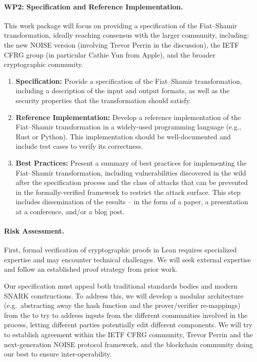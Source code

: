 \documentclass{article}
\begin{document}
\paragraph{WP2: Specification and Reference Implementation. }
This work package will focus on providing a specification of the Fiat--Shamir transformation, ideally reaching consensus with the larger community, including: the new NOISE version (involving Trevor Perrin in the discussion), the IETF CFRG group (in particular Cathie Yun from Apple), and the broader cryptographic community.
\begin{enumerate}[label=\textbf{Step \arabic*:}, leftmargin=*, itemsep=0.5em]

    \item \textbf{Specification:} Provide a specification of the Fiat--Shamir transformation, including a description of the input and output formats, as well as the security properties that the transformation should satisfy.
    \item \textbf{Reference Implementation:} Develop a reference implementation of the Fiat--Shamir transformation in a widely-used programming language (e.g., Rust or Python). This implementation should be well-documented and include test cases to verify its correctness.
    \item \textbf{Best Practices:} Present a summary of best practices for implementing the Fiat--Shamir transformation, including vulnerabilities discovered in the wild after the specification process and the class of attacks that can be prevented in the formally-verified framework to restrict the attack surface. This step includes dissemination of the results  -- in the form of a paper, a presentation at a conference, and/or a blog post.
\end{enumerate}


\paragraph{Risk Assessment.}
First, formal verification of cryptographic proofs in Lean requires specialized expertise and may encounter technical challenges. We will seek external expertise and follow an established proof strategy from prior work.

Our specification must appeal both traditional standards bodies and modern SNARK constructions. To address this, we will develop a modular architecture (e.g.\ abstracting away the hash function and the prover/verifier re-mappings) from the  to try to address inputs from the different communities involved in the process, letting different parties potentially edit different components. We will try to establish agreement within the IETF CFRG community, Trevor Perrin and the next-generation NOISE protocol framework, and the blockchain community doing our best to ensure inter-operability.
\end{document}
